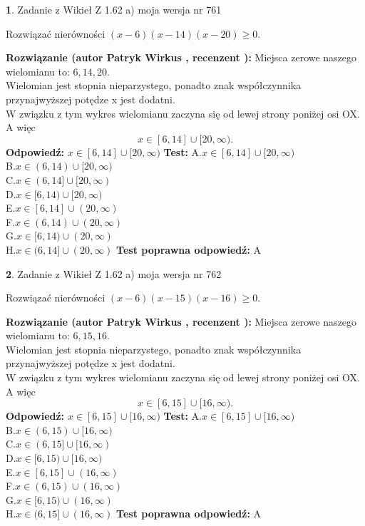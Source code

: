 \documentclass[12pt, a4paper]{article}
\theoremstyle{definition} %
\newtheorem{zad}{}
\newcommand{\zadStart}[1]{\begin{zad}#1\newline}
\newcommand{\zadStop}{\end{zad}}
\newcommand{\rozwStart}[2]{\noindent \textbf{Rozwiązanie (autor #1 , recenzent #2): }\newline}
\newcommand{\rozwStop}{\newline}
\newcommand{\odpStart}{\noindent \textbf{Odpowiedź:}\newline}
\newcommand{\odpStop}{\newline}
\newcommand{\testStart}{\noindent \textbf{Test:}\newline}
\newcommand{\testStop}{\newline}
\newcommand{\kluczStart}{\noindent \textbf{Test poprawna odpowiedź:}\newline}
\newcommand{\kluczStop}{\newline}
\begin{document}
\zadStart{Zadanie z Wikieł Z 1.62 a) moja wersja nr 761}

Rozwiązać nierówności $(x-6)(x-14)(x-20)\ge0$.
\zadStop
\rozwStart{Patryk Wirkus}{}
Miejsca zerowe naszego wielomianu to: $6, 14, 20$.\\
Wielomian jest stopnia nieparzystego, ponadto znak współczynnika przy\linebreak najwyższej potędze x jest dodatni.\\ W związku z tym wykres wielomianu zaczyna się od lewej strony poniżej osi OX. A więc $$x \in [6,14] \cup [20,\infty).$$
\rozwStop
\odpStart
$x \in [6,14] \cup [20,\infty)$
\odpStop
\testStart
A.$x \in [6,14] \cup [20,\infty)$\\
B.$x \in (6,14) \cup [20,\infty)$\\
C.$x \in (6,14] \cup [20,\infty)$\\
D.$x \in [6,14) \cup [20,\infty)$\\
E.$x \in [6,14] \cup (20,\infty)$\\
F.$x \in (6,14) \cup (20,\infty)$\\
G.$x \in [6,14) \cup (20,\infty)$\\
H.$x \in (6,14] \cup (20,\infty)$
\testStop
\kluczStart
A
\kluczStop



\zadStart{Zadanie z Wikieł Z 1.62 a) moja wersja nr 762}

Rozwiązać nierówności $(x-6)(x-15)(x-16)\ge0$.
\zadStop
\rozwStart{Patryk Wirkus}{}
Miejsca zerowe naszego wielomianu to: $6, 15, 16$.\\
Wielomian jest stopnia nieparzystego, ponadto znak współczynnika przy\linebreak najwyższej potędze x jest dodatni.\\ W związku z tym wykres wielomianu zaczyna się od lewej strony poniżej osi OX. A więc $$x \in [6,15] \cup [16,\infty).$$
\rozwStop
\odpStart
$x \in [6,15] \cup [16,\infty)$
\odpStop
\testStart
A.$x \in [6,15] \cup [16,\infty)$\\
B.$x \in (6,15) \cup [16,\infty)$\\
C.$x \in (6,15] \cup [16,\infty)$\\
D.$x \in [6,15) \cup [16,\infty)$\\
E.$x \in [6,15] \cup (16,\infty)$\\
F.$x \in (6,15) \cup (16,\infty)$\\
G.$x \in [6,15) \cup (16,\infty)$\\
H.$x \in (6,15] \cup (16,\infty)$
\testStop
\kluczStart
A
\kluczStop
\end{document}
